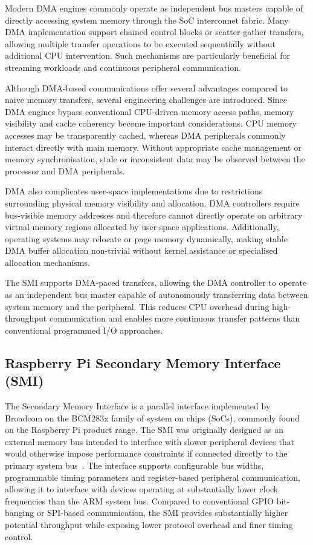\documentclass[final]{cmpreport}
\begin{document}
Modern DMA engines commonly operate as independent bus masters capable of directly accessing system memory through the SoC interconnet fabric. Many DMA implementation support chained control blocks or scatter-gather transfers, allowing multiple transfer operations to be executed sequentially without additional CPU intervention. Such mechanisms are particularly beneficial for streaming workloads and continuous peripheral communication.

Although DMA-based communications offer several advantages compared to naive memory transfers, several engineering challenges are introduced. Since DMA engines bypass conventional CPU-driven memory access paths, memory visibility and cache coherency become important considerations. CPU memory accesses may be transparently cached, whereas DMA peripherals commonly interact directly with main memory. Without appropriate cache management or memory synchronisation, stale or inconsistent data may be observed between the processor and DMA peripherals.

DMA also complicates user-space implementations due to restrictions surrounding physical memory visibility and allocation. DMA controllers require bus-visible memory addresses and therefore cannot directly operate on arbitrary virtual memory regions allocated by user-space applications. Additionally, operating systems may relocate or page memory dynamically, making stable DMA buffer allocation non-trivial without kernel assistance or specialised allocation mechanisms.

The SMI supports DMA-paced transfers, allowing the DMA controller to operate as an independent bus master capable of autonomously transferring data between system memory and the peripheral. This reduces CPU overhead during high-throughput communication and enables more continuous transfer patterns than conventional programmed I/O approaches.

\subsection{Raspberry Pi Secondary Memory Interface (SMI)}
The Secondary Memory Interface is a parallel interface implemented by Broadcom on the BCM283x family of system on chips (SoCs), commonly found on the Raspberry Pi product range. The SMI was originally designed as an external memory bus intended to interface with slower peripheral devices that would otherwise impose performance constraints if connected directly to the primary system bus~\cite{zotero-item-12}. The interface supports configurable bus widths, programmable timing parameters and register-based peripheral communication, allowing it to interface with devices operating at substantially lower clock frequencies than the ARM system bus. Compared to conventional GPIO bit-banging or SPI-based communication, the SMI provides substantially higher potential throughput while exposing lower protocol overhead and finer timing control.
\end{document}
